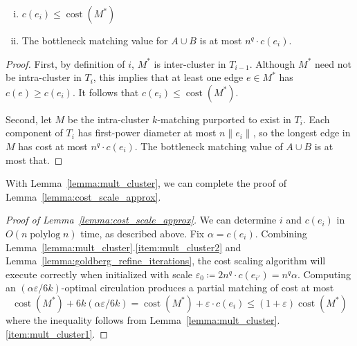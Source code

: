 \documentclass[a4paper,UKenglish]{socg-lipics-v2018}
\def\polylog{\mathop{\mathrm{polylog}}}
\def\eps{\varepsilon}
\def\norm#1{\mathopen\| #1 \mathclose\|}	%
\def\cost{\operatorname{cost}}
\theoremstyle{plain}
\numberwithin{figure}{section}
\renewcommand{\paragraph}{\subparagraph}
\begin{document}
\begin{toappendix}
\begin{lemma}
\label{lemma:mult_cluster}
\begin{enumerate}[(i)]
\item \label{item:mult_cluster1}
	$c(e_i) \leq \cost(M^*)$
\item \label{item:mult_cluster2}
	The bottleneck matching value for $A \cup B$ is at most $n^q \cdot c(e_i)$.
\end{enumerate}
\end{lemma}
\begin{proof}
First, by definition of $i$, $M^*$ is inter-cluster in $T_{i-1}$.
Although $M^*$ need not be intra-cluster in $T_i$, this implies that at least
one edge $e \in M^*$ has $c(e) \geq c(e_i)$.
It follows that $c(e_i) \leq \cost(M^*)$.

Second, let $M$ be the intra-cluster $k$-matching purported to exist in $T_i$.
Each component of $T_i$ has first-power diameter at most $n\norm{e_i}$,
so the longest edge in $M$ has cost at most $n^q \cdot c(e_i)$.
The bottleneck matching value of $A \cup B$ is at most that.
\end{proof}

With Lemma~\ref{lemma:mult_cluster}, we can complete the proof of
Lemma~\ref{lemma:cost_scale_approx}.

\begin{proof}[Proof of Lemma~\ref{lemma:cost_scale_approx}]
We can determine $i$ and $c(e_i)$ in $O(n\polylog n)$ time, as described above.
Fix $\alpha = c(e_i)$.
Combining Lemma~\ref{lemma:mult_cluster}.\ref{item:mult_cluster2} and
Lemma~\ref{lemma:goldberg_refine_iterations},
the cost scaling algorithm will execute correctly when initialized with
scale $\eps_0 \coloneqq 2n^q \cdot c(e_{i'}) = n^q \alpha$.
Computing an $(\alpha\eps/6k)$-optimal circulation produces a partial matching
of cost at most
\begin{equation*}
\cost(M^*) + 6k(\alpha\eps/6k) = \cost(M^*) + \eps \cdot c(e_i)
	\leq (1+\eps) \cost(M^*)
\end{equation*}
where the inequality follows from Lemma~\ref{lemma:mult_cluster}.\ref{item:mult_cluster1}.
\end{proof}







\end{toappendix}
\end{document}
